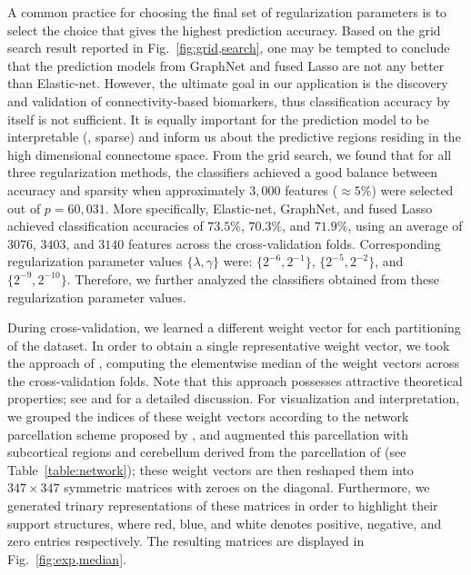 A common practice for choosing the final set of regularization parameters is to select the choice that gives the highest prediction accuracy.
Based on the grid search result reported in Fig.~\ref{fig:grid,search}, one may be tempted to conclude that the prediction models from GraphNet and fused Lasso are not any better than Elastic-net.
However, the ultimate goal in our application is the discovery and validation of connectivity-based biomarkers, thus classification accuracy by itself is not sufficient.
It is equally important for the prediction model to be interpretable  (\eg, sparse) and inform us about the predictive regions residing in the high dimensional connectome space.
From the grid search, we found that for all three regularization methods, the classifiers achieved a good balance between accuracy and sparsity when approximately $3,000$ features ($\approx 5\%$) were selected out of $p=60,031$.
More specifically, Elastic-net, GraphNet, and fused Lasso achieved classification accuracies of $73.5\%$, $70.3\%$, and $71.9\%$, using an average of $3076$, $3403$, and $3140$ features across the cross-validation folds.
Corresponding regularization parameter values $\{\lambda,\gamma\}$ were: $\{2^{-6},2^{-1}\}$, $\{2^{-5},2^{-2}\}$, and $\{2^{-9},2^{-10}\}$.
Therefore, we further analyzed the classifiers obtained from these regularization parameter values. 

During cross-validation, we learned a different weight vector for each partitioning of the dataset.
In order to obtain a single representative weight vector, we took the approach of \cite{Grosenick:2013}, computing the elementwise median of the weight vectors across the cross-validation folds.
Note that this approach possesses attractive theoretical properties; see \cite{Grosenick:2013} and \cite{Minsker:2013} for a detailed discussion.
For visualization and interpretation, we grouped the indices of these weight vectors according to the network parcellation scheme proposed by \cite{Yeo:2011}, and augmented this parcellation with subcortical regions and cerebellum derived from the parcellation of \cite{AAL:2002} (see Table~\ref{table:network}); these weight vectors are then reshaped them into $347\times 347$ symmetric matrices with zeroes on the diagonal.
Furthermore, we generated trinary representations of these matrices in order to highlight their support structures, where red, blue, and white denotes positive, negative, and zero entries respectively.
The resulting matrices are displayed in Fig.~\ref{fig:exp,median}.

